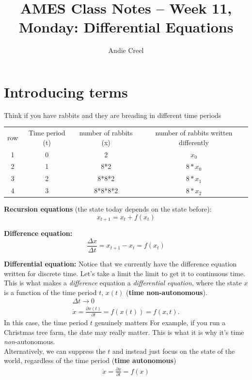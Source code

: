 \documentclass{article}
\title{AMES Class Notes -- Week 11, Monday: Differential Equations}
\author{Andie Creel}
\begin{document}
\maketitle

\section{Introducing terms}
Think if you have rabbits and they are breading in different time periods 

\begin{center}
    \begin{tabular}{ c c c c}
     row & Time period (t) & number of rabbits (x) & number of rabbits written differently \\
     1 & 0 & 2 & $x_0$\\ 
     2 & 1 & 8*2 & $8* x_0$\\  
     3 & 2 & 8*8*2 & $8*x_1$  \\
     4 & 3 & 8*8*8*2 & $8* x_2$
    \end{tabular}
\end{center}

\textbf{Recursion equations }(the state today depends on the state before): 
\[x_{t+1} = x_t + f(x_t)\]

\textbf{Difference equation: }
\[\frac{\Delta x}{\Delta t} = x_{t+1} - x_t = f(x_t)\]

\textbf{Differential equation:} Notice that we currently have the difference equation written for discrete time. Let's take a limit the limit to get it to continuous time. This is what makes a \textit{difference} equation a \textit{differential equation}, where the state $x$ is a function of the time period $t$, $x(t)$ (\textbf{time non-autonomous}). 
\begin{align}
    \Delta t \rightarrow 0\\
    \dot x = \frac{\partial x(t)}{\partial t} = f(x(t)) = f(x, t). \label{nonauto}
\end{align}
In this case, the time period $t$ genuinely matters  For example, if you run a Christmas tree farm, the date may really matter. This is what it is why it's time \textit{non}-autonomous. \\


Alternatively, we can suppress the $t$ and instead just focus on the state of the world, regardless of the time period (\textbf{time autonomous})
\begin{align}
    \dot x = \frac{\partial x}{\partial t} = f(x) \label{auto}
\end{align}
\end{document}
